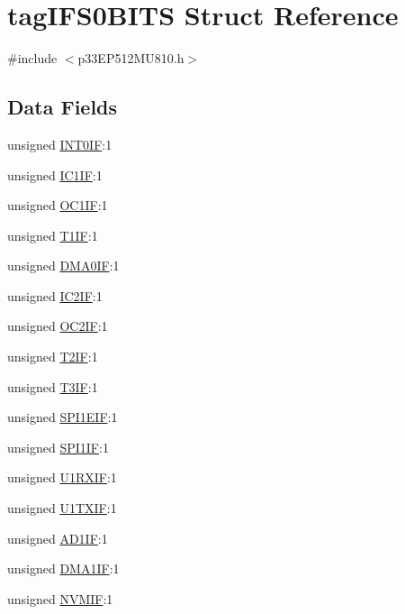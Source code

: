 \hypertarget{structtag_i_f_s0_b_i_t_s}{}\section{tag\+I\+F\+S0\+B\+I\+TS Struct Reference}
\label{structtag_i_f_s0_b_i_t_s}


{\ttfamily \#include $<$p33\+E\+P512\+M\+U810.\+h$>$}

\subsection*{Data Fields}
\begin{DoxyCompactItemize}
\item 
unsigned \hyperlink{structtag_i_f_s0_b_i_t_s_a9879ca934031776b77a0c19f1dce1b54}{I\+N\+T0\+IF}\+:1
\item 
unsigned \hyperlink{structtag_i_f_s0_b_i_t_s_ac269ae6651165f81c6bb3af6255e86a8}{I\+C1\+IF}\+:1
\item 
unsigned \hyperlink{structtag_i_f_s0_b_i_t_s_a89a11246f8785451cd82b2c073a25dd6}{O\+C1\+IF}\+:1
\item 
unsigned \hyperlink{structtag_i_f_s0_b_i_t_s_a04ccdb4e4e41c7da1e40e14107ac2548}{T1\+IF}\+:1
\item 
unsigned \hyperlink{structtag_i_f_s0_b_i_t_s_a2e894312e98b8789b8ba5863fb524e9d}{D\+M\+A0\+IF}\+:1
\item 
unsigned \hyperlink{structtag_i_f_s0_b_i_t_s_a94751a2f8a1721695e333710f21cd01d}{I\+C2\+IF}\+:1
\item 
unsigned \hyperlink{structtag_i_f_s0_b_i_t_s_ac5e8aa48681060ac4076d19bf953b5d5}{O\+C2\+IF}\+:1
\item 
unsigned \hyperlink{structtag_i_f_s0_b_i_t_s_a28a9074ccb0200781810ce857200062b}{T2\+IF}\+:1
\item 
unsigned \hyperlink{structtag_i_f_s0_b_i_t_s_ad495e17e9037c483d69d81d8672884bc}{T3\+IF}\+:1
\item 
unsigned \hyperlink{structtag_i_f_s0_b_i_t_s_ac8f55c2a59ae4c1d114fdbccf18d59c4}{S\+P\+I1\+E\+IF}\+:1
\item 
unsigned \hyperlink{structtag_i_f_s0_b_i_t_s_a507998cbba62db39b406edb88a227092}{S\+P\+I1\+IF}\+:1
\item 
unsigned \hyperlink{structtag_i_f_s0_b_i_t_s_aeba83f78089f87ddc134906d8ed45441}{U1\+R\+X\+IF}\+:1
\item 
unsigned \hyperlink{structtag_i_f_s0_b_i_t_s_ad749e93383582e0fbfc2e7121efba5f8}{U1\+T\+X\+IF}\+:1
\item 
unsigned \hyperlink{structtag_i_f_s0_b_i_t_s_acd59f735fd2c1101a6818cba6bcfb3e2}{A\+D1\+IF}\+:1
\item 
unsigned \hyperlink{structtag_i_f_s0_b_i_t_s_afff7dd52af1a613df91e3aae06923062}{D\+M\+A1\+IF}\+:1
\item 
unsigned \hyperlink{structtag_i_f_s0_b_i_t_s_a7cbc45c36207b15f2cee9ccd84900264}{N\+V\+M\+IF}\+:1
\end{DoxyCompactItemize}


